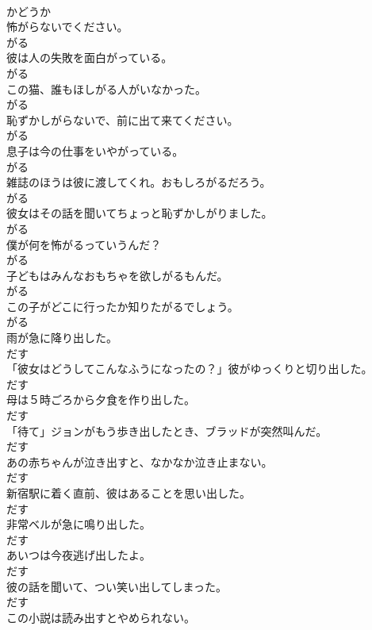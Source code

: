 \documentclass[8pt]{extreport}
\begin{document}
\begin{CJK}{UTF8}{min}
\\	かどうか
\\	怖がらないでください。	
\\	がる
\\	彼は人の失敗を面白がっている。	
\\	がる
\\	この猫、誰もほしがる人がいなかった。	
\\	がる
\\	恥ずかしがらないで、前に出て来てください。	
\\	がる
\\	息子は今の仕事をいやがっている。	
\\	がる
\\	雑誌のほうは彼に渡してくれ。おもしろがるだろう。	
\\	がる
\\	彼女はその話を聞いてちょっと恥ずかしがりました。	
\\	がる
\\	僕が何を怖がるっていうんだ？	
\\	がる
\\	子どもはみんなおもちゃを欲しがるもんだ。	
\\	がる
\\	この子がどこに行ったか知りたがるでしょう。	
\\	がる
\\	雨が急に降り出した。	
\\	だす
\\	「彼女はどうしてこんなふうになったの？」彼がゆっくりと切り出した。	
\\	だす
\\	母は５時ごろから夕食を作り出した。	
\\	だす
\\	「待て」ジョンがもう歩き出したとき、ブラッドが突然叫んだ。	
\\	だす
\\	あの赤ちゃんが泣き出すと、なかなか泣き止まない。	
\\	だす
\\	新宿駅に着く直前、彼はあることを思い出した。	
\\	だす
\\	非常ベルが急に鳴り出した。	
\\	だす
\\	あいつは今夜逃げ出したよ。	
\\	だす
\\	彼の話を聞いて、つい笑い出してしまった。	
\\	だす
\\	この小説は読み出すとやめられない。	

\end{CJK}
\end{document}
